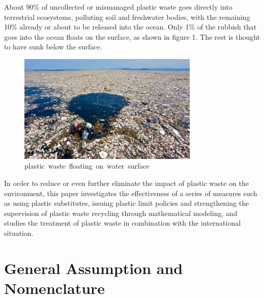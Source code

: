 \documentclass{mcmthesis}
\begin{document}
About 90\% of uncollected or mismanaged plastic waste goes directly into terrestrial ecosystems, polluting soil and freshwater bodies, with the remaining 10\% already or about to be released into the ocean. Only 1\% of the rubbish that goes into the ocean floats on the surface, as shown in figure 1. The rest is thought to have sunk below the surface.
\begin{figure}[H]
	\centering
	\includegraphics[width=8.59cm,height=5.18cm]{figure/introduction.png}
   \caption{plastic waste floating on water surface}
\end{figure}
In order to reduce or even further eliminate the impact of plastic waste on the environment, this paper investigates the effectiveness of a series of measures such as using plastic substitutes, issuing plastic limit policies and strengthening the supervision of plastic waste recycling through mathematical modeling, and studies the treatment of plastic waste in combination with the international situation.

		
\section{General Assumption and Nomenclature}
\end{document}
